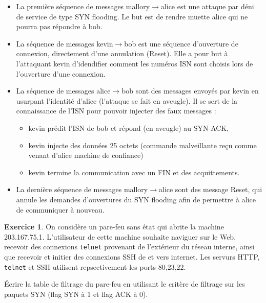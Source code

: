 \documentclass[a4paper,9pt]{article}
\theoremstyle{plain}
\theoremstyle{definition}
\newtheorem{exercice}{Exercice}
\begin{document}
\begin{correction}
\begin{itemize}
\item La première séquence de messages mallory$\to$alice est une attaque par déni de service de type SYN flooding. Le but est de rendre muette alice qui ne pourra pas répondre à bob. 

\item La séquence de messages kevin$\to$bob est une séquence d'ouverture de connexion, directement d'une annulation (Reset). Elle a pour but à l'attaquant kevin d'idendifier comment les numéros ISN sont choisis lors de l'ouverture d'une connexion.

\item La séquence de messages alice$\to$bob sont des messages envoyés par kevin en usurpant l'identité d'alice (l'attaque se fait en aveugle). Il se sert de la connaissance de l'ISN pour pouvoir injecter des faux messages : 
\begin{itemize}
\item kevin prédit l'ISN de bob et  répond (en aveugle) au SYN-ACK,
\item kevin injecte des données 25 octets (commande malveillante reçu comme venant d'alice machine de confiance) 
\item kevin termine la communication avec un FIN et des acquittements.
\end{itemize}
\item La dernière séquence de messages mallory$\to$alice sont des message Reset, qui annule les demandes d'ouvertures du SYN flooding afin de permettre à alice de communiquer à nouveau. 
\end{itemize}
\end{correction}



\begin{exercice}
On considère un pare-feu sans état qui abrite la machine 203.167.75.1. L'utilisateur de cette machine souhaite naviguer sur le Web, recevoir des connexions \verb|telnet| provenant de l'extérieur du réseau interne, ainsi que recevoir et initier des connexions SSH de et vers internet. Les servurs HTTP, \verb|telnet| et SSH utilisent repsectivement les ports 80,23,22.

\'Ecrire la table de filtrage du pare-feu en utilisant le critère de filtrage sur les paquets SYN (flag SYN à 1 et flag ACK à 0).
\end{exercice}
\end{document}
